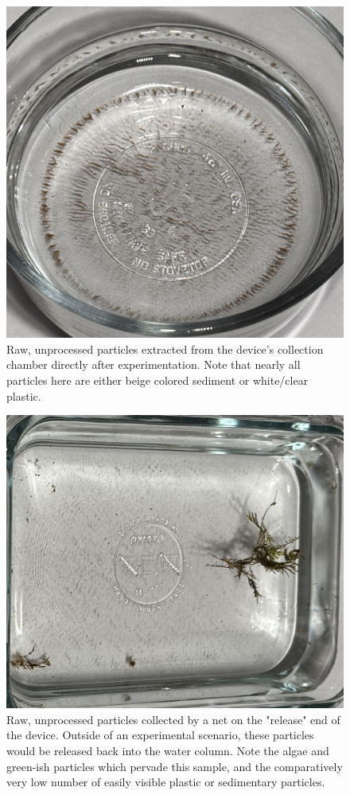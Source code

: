\documentclass[fleqn,10pt]{SelfArx} %
\begin{document}
	\begin{figure}[h]
		\centering
		\includegraphics[width=1\linewidth]{Figures/RawSeparated}
		\caption[Raw Separated Plastics]{Raw, unprocessed particles extracted from the device's collection chamber directly after experimentation. Note that nearly all particles here are either beige colored sediment or white/clear plastic.}
		\label{fig:rawseparated}
	\end{figure}
	
	\begin{figure}[h]
		\centering
		\includegraphics[angle=90,origin=c,width=1\linewidth]{Figures/RawReleased}
		\caption[Raw Released Particles]{Raw, unprocessed particles collected by a net on the "release" end of the device. Outside of an experimental scenario, these particles would be released back into the water column. Note the algae and green-ish particles which pervade this sample, and the comparatively very low number of easily visible plastic or sedimentary particles.}
		\label{fig:rawreleased}
	\end{figure}
	
\end{document}
